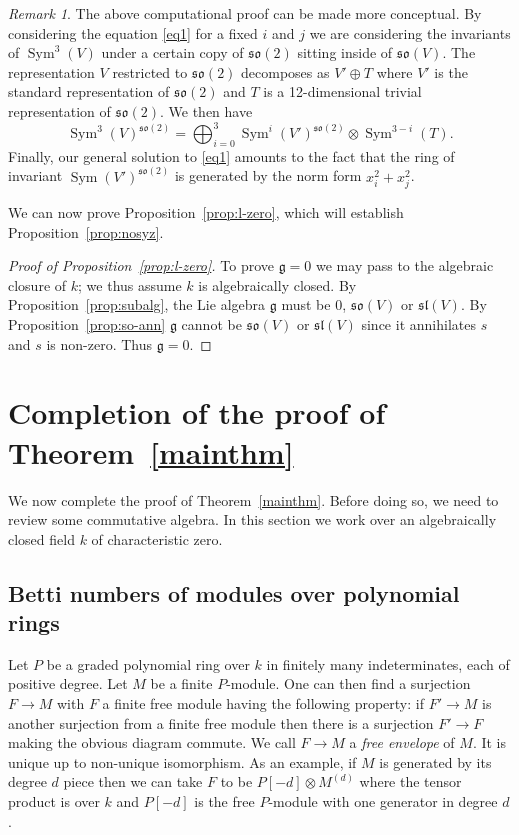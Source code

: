 \documentclass{amsart}
\theoremstyle{definition}
\theoremstyle{remark}
\newtheorem{remark}[theorem]{\it Remark}
\DeclareMathOperator{\Sym}{Sym}
\let\mf\mathfrak
\begin{document}
\begin{remark}
The above computational proof can be made more conceptual.  By considering
the equation \eqref{eq1} for a fixed $i$ and $j$ we are considering the
invariants of $\Sym^3(V)$ under a certain copy of $\mf{so}(2)$ sitting inside
of $\mf{so}(V)$.  The representation $V$ restricted to $\mf{so}(2)$ decomposes
as $V' \oplus T$ where $V'$ is the standard representation of $\mf{so}(2)$
and $T$ is a 12-dimensional trivial representation of $\mf{so}(2)$.  We
then have
\begin{displaymath}
\Sym^3(V)^{\mf{so}(2)}=\bigoplus_{i=0}^3 \Sym^i(V')^{\mf{so}(2)} \otimes
\Sym^{3-i}(T).
\end{displaymath}
Finally, our general solution to \eqref{eq1} amounts to the fact that the
ring of invariant $\Sym(V')^{\mf{so}(2)}$ is generated by the norm form
$x_i^2+x_j^2$.
\end{remark}

We can now prove Proposition~\ref{prop:l-zero}, which will establish
Proposition~\ref{prop:nosyz}.

\begin{proof}[Proof of Proposition~\ref{prop:l-zero}]
To prove $\mf{g}=0$ we may pass to the algebraic closure of $k$; we thus
assume $k$ is algebraically closed.  By Proposition~\ref{prop:subalg}, the Lie
algebra $\mf{g}$ must be 0, $\mf{so}(V)$ or $\mf{sl}(V)$.  By
Proposition~\ref{prop:so-ann} $\mf{g}$ cannot be $\mf{so}(V)$ or $\mf{sl}(V)$
since it annihilates $s$ and $s$ is non-zero.  Thus $\mf{g}=0$.
\end{proof}


\section{Completion of the proof of Theorem~\ref{mainthm}}
\label{s:fin}

We now complete the proof of Theorem~\ref{mainthm}.  Before doing so, we need to
review some commutative algebra.  In this section we work over an algebraically
closed field $k$ of characteristic zero. 


\subsection{Betti numbers of modules over polynomial rings}

Let $P$ be a graded polynomial ring over $k$ in finitely many indeterminates,
each of positive degree.  Let $M$ be a finite $P$-module.  One can then find a
surjection $F \to M$ with $F$ a finite free module having the following
property: if $F' \to M$ is another surjection from a finite free module then
there is a surjection $F' \to F$ making the obvious diagram commute.  We call
$F \to M$ a \emph{free envelope} of $M$.  It is unique up to non-unique
isomorphism.  As an example, if $M$ is generated by its degree $d$ piece then
we can take $F$ to be $P[-d] \otimes M^{(d)}$ where the tensor product is over
$k$ and $P[-d]$ is the free $P$-module with one generator in degree $d$.
\end{document}
